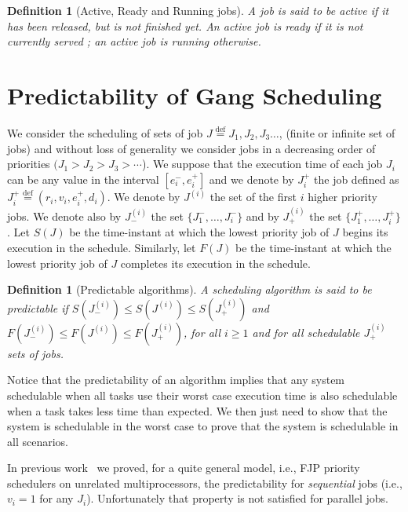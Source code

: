 \documentclass[a4paper]{article}
\newtheorem{definition}[theorem]{Definition}
\newcommand{\equals}{\stackrel{\mathrm{def}}{=}}
\begin{document}
\begin{definition}[Active, Ready and Running jobs]
A job is said to be \emph{active} if it has been released, but is not finished yet. An active job is \emph{ready} if it is not currently served ; an active job is \emph{running} otherwise. 
\end{definition}




\section{Predictability of Gang Scheduling}\label{sec:predict}


We consider the scheduling of sets of job $J \equals J_{1}, J_{2}, J_{3}\ldots$, (finite or infinite set of jobs) and without loss of generality we consider jobs in a decreasing order of priorities $(J_1 > J_2 > J_{3} > \cdots$). We suppose that the execution time of each job $J_i$ can be any value in the interval $[e_i^{-}, e_i^{+}]$ and we denote by $J^{+}_i$ the job defined as $J^{+}_i \equals (r_i,v_{i},e_i^{+},d_i)$. We denote by $J^{(i)}$ the set of the first $i$ higher priority jobs. We denote also by $J^{(i)}_{-}$ the set $\{ J^{-}_1, \ldots, J^{-}_i \}$ and by $J^{(i)}_{+}$ the set $\{J^{+}_1, \ldots, J^{+}_i \}$. Let $S(J)$ be the time-instant at which the lowest priority job of $J$ begins its execution in the schedule. Similarly, let $F(J)$ be the time-instant at which the lowest priority job of $J$ completes its execution in the schedule.

\begin{definition}[Predictable algorithms]
A scheduling algorithm is said to be {\em predictable} if $S(J^{(i)}_{-}) \leq S(J^{(i)}) \leq S(J^{(i)}_{+})$ and $F(J^{(i)}_{-}) \leq F(J^{(i)}) \leq F(J^{(i)}_{+})$, for all $i \geq 1$ and for all schedulable $J^{(i)}_{+}$ sets of jobs.
\end{definition}

Notice that the predictability of an algorithm implies that any system schedulable when all tasks use their worst case execution time is also schedulable when a task takes less time than expected. We then just need to show that the system is schedulable in the worst case to prove that the system is schedulable in all scenarios.


In previous work~\cite{Cucu-Grosjean2009Predictability-} we proved, for a quite general model, i.e., FJP priority schedulers on unrelated multiprocessors, the predictability for \emph{sequential} jobs (i.e., $v_{i}=1$ for any $J_{i}$). Unfortunately that property is not satisfied for parallel jobs.
\end{document}
